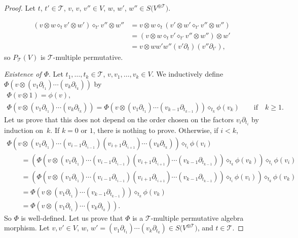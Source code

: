 \documentclass[10pt,a4paper]{amsart}
\numberwithin{equation}{section}
\newcommand{\T}{\mathcal{T}}
\begin{document}
\begin{proof}
Let $t$, $t'\in \T$, $v$, $v$, $v'' \in V$,
$w$, $w'$, $w''\in S\big(V^{\oplus\T}\big)$.
{\samepage\begin{align*}
(v\otimes w \diamond_t v'\otimes w')\diamond_{t'} v''\otimes w''
&=v\otimes w \diamond_t (v'\otimes w'\diamond_{t'} v''\otimes w'')\\[.5ex]
&=(v\otimes w \diamond_t v'\diamond_{t'} v''\otimes w'')\otimes w'\\[.5ex]
&=v\otimes ww'w'' (v'\partial_t)(v''\partial_{t'}),
\end{align*}
so $P_\T(V)$ is $\T$-multiple permutative.

}

\textit{Existence of $\Phi$}. Let $t_1,\dots,t_k\in \T$, $v,v_1,\dots,v_k\in V$. We inductively
define $\Phi(v\otimes (v_1\partial_{t_1})\cdots \allowbreak
(v_k\partial_{t_k}))$ by
\begin{gather*}
\Phi(v\otimes 1)=\phi(v),
\\[.5ex]
\Phi(v\otimes (v_1\partial_{t_1})\cdots (v_k\partial_{t_k}))
=\Phi(v\otimes (v_1\partial_{t_1})\cdots (v_{k-1}\partial_{t_{k-1}})) \diamond_{t_k} \phi(v_k)\qquad \mbox{if}\quad k\geq 1.
\end{gather*}
Let us prove that this does not depend on the order chosen on the factors $v_i\partial_{t_i}$ by induction on~$k$.
If $k=0$ or $1$, there is nothing to prove. Otherwise, if $i<k$,
\begin{gather*}
\Phi(v\otimes (v_1\partial_{t_1})\cdots (v_{i-1}\partial_{t_{i-1}})(v_{i+1}\partial_{t_{i+1}})\cdots
(v_k\partial_{t_k}))\diamond_{t_i} \phi(v_i)
\\[.5ex] \qquad
{}=(\Phi(v\otimes (v_1\partial_{t_1})\cdots (v_{i-1}\partial_{t_{i-1}})(v_{i+1}\partial_{t_{i+1}})\cdots
(v_{k-1}\partial_{t_{k-1}}))\diamond_{t_k} \phi(v_k))\diamond_{t_i} \phi(v_i)
\\[.5ex] \qquad
{}=(\Phi(v\otimes (v_1\partial_{t_1})\cdots (v_{i-1}\partial_{t_{i-1}})(v_{i+1}\partial_{t_{i+1}})\cdots
(v_{k-1}\partial_{t_{k-1}}))\diamond_{t_i} \phi(v_i))\diamond_{t_k} \phi(v_k)
\\[.5ex] \qquad
{}=\Phi(v\otimes (v_1\partial_{t_1})\cdots (v_{k-1}\partial_{t_{k-1}}))\diamond_{t_k} \phi(v_k)
\\[.5ex] \qquad
{}=\Phi(v\otimes (v_1\partial_{t_1})\cdots (v_k\partial_{t_k})).
\end{gather*}
So $\Phi$ is well-defined. Let us prove that $\Phi$ is a $\T$-multiple permutative algebra morphism.
Let $v,v'\in V$, $w$, $w'=(v_1\partial_{t_1})\cdots (v_k\partial_{t_k}) \in S\big(V^{\oplus\T}\big)$, and $t\in \T$.

\end{proof}
\end{document}
